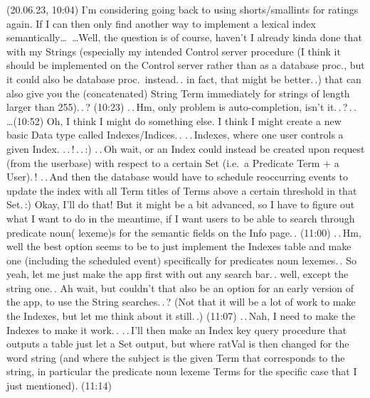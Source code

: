 \documentclass{report}
\begin{document}
(20.06.23, 10:04) I'm considering going back to using shorts/smallints for ratings again. If I can then only find another way to implement a lexical index semantically\ldots\ \ldots Well, the question is of course, haven't I already kinda done that with my Strings (especially my intended Control server procedure (I think it should be implemented on the Control server rather than as a database proc., but it could also be database proc.\ instead.\,. in fact, that might be better.\,.) that can also give you the (concatenated) String Term immediately for strings of length larger than 255).\,.\,? (10:23) .\,.\,Hm, only problem is auto-completion, isn't it.\,.\,?\,.\,. \ldots (10:52) Oh, I think I might do something else. I think I might create a new basic Data type called Indexes/Indices.\,. .\,.\,Indexes, where one user controls a given Index. .\,.\,!\,.\,.\,:) .\,.\,Oh wait, or an Index could instead be created upon request (from the userbase) with respect to a certain Set (i.e.\ a Predicate Term + a User).\,! .\,.\,And then the database would have to schedule reoccurring events to update the index with all Term titles of Terms above a certain threshold in that Set.\,:) Okay, I'll do that! But it might be a bit advanced, so I have to figure out what I want to do in the meantime, if I want users to be able to search through predicate noun( lexeme)s for the semantic fields on the Info page.\,. (11:00) .\,.\,Hm, well the best option seems to be to just implement the Indexes table and make one (including the scheduled event) specifically for predicates noun lexemes.\,. So yeah, let me just make the app first with out any search bar.\,. well, except the string one.\,. Ah wait, but couldn't that also be an option for an early version of the app, to use the String searches.\,.\,? (Not that it will be a lot of work to make the Indexes, but let me think about it still.\,.) (11:07) .\,.\,Nah, I need to make the Indexes to make it work.\,. .\,.\,I'll then make an Index key query procedure that outputs a table just let a Set output, but where ratVal is then changed for the word string (and where the subject is the given Term that corresponds to the string, in particular the predicate noun lexeme Terms for the specific case that I just mentioned). (11:14)
\end{document}
